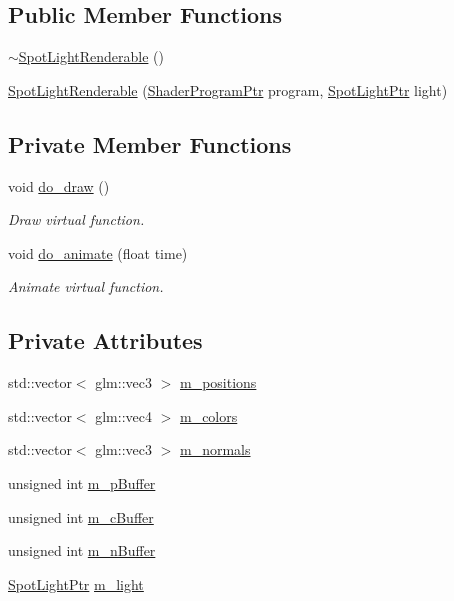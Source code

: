 \subsection*{Public Member Functions}
\begin{DoxyCompactItemize}
\item 
\hyperlink{classSpotLightRenderable_a30316bc578e59e0b37dbeda6603edcd5}{$\sim$\+Spot\+Light\+Renderable} ()
\item 
\hyperlink{classSpotLightRenderable_aa65580e442e0467e7fd2b0e7cfba6c53}{Spot\+Light\+Renderable} (\hyperlink{ShaderProgram_8hpp_af8e4af1ad4c53875ee5d32ab7e1f4966}{Shader\+Program\+Ptr} program, \hyperlink{Light_8hpp_a1865f598c5eed6e6e1f79d7296852092}{Spot\+Light\+Ptr} light)
\end{DoxyCompactItemize}
\subsection*{Private Member Functions}
\begin{DoxyCompactItemize}
\item 
void \hyperlink{classSpotLightRenderable_a21d59c1b51e65288de7ff1d8bb861471}{do\+\_\+draw} ()
\begin{DoxyCompactList}\small\item\em Draw virtual function. \end{DoxyCompactList}\item 
void \hyperlink{classSpotLightRenderable_a628c20078ed7f102927e5d36fe25bb57}{do\+\_\+animate} (float time)
\begin{DoxyCompactList}\small\item\em Animate virtual function. \end{DoxyCompactList}\end{DoxyCompactItemize}
\subsection*{Private Attributes}
\begin{DoxyCompactItemize}
\item 
std\+::vector$<$ glm\+::vec3 $>$ \hyperlink{classSpotLightRenderable_a295c67f086347225b7e3f9ded409a447}{m\+\_\+positions}
\item 
std\+::vector$<$ glm\+::vec4 $>$ \hyperlink{classSpotLightRenderable_ab15200db61464b5426cae2629c51d47a}{m\+\_\+colors}
\item 
std\+::vector$<$ glm\+::vec3 $>$ \hyperlink{classSpotLightRenderable_a43ece8056bee96e36a7e7f51b9b105e2}{m\+\_\+normals}
\item 
unsigned int \hyperlink{classSpotLightRenderable_a3701141e0cadd3c4d6892ada7397ddf1}{m\+\_\+p\+Buffer}
\item 
unsigned int \hyperlink{classSpotLightRenderable_ab8dafa5c0184b6faa93d659d8a7e1d3b}{m\+\_\+c\+Buffer}
\item 
unsigned int \hyperlink{classSpotLightRenderable_a051d65c46c79b4f43c4098bd443e24a3}{m\+\_\+n\+Buffer}
\item 
\hyperlink{Light_8hpp_a1865f598c5eed6e6e1f79d7296852092}{Spot\+Light\+Ptr} \hyperlink{classSpotLightRenderable_a0aab1ea4d5ece2308a9b66280621d8ff}{m\+\_\+light}
\end{DoxyCompactItemize}
